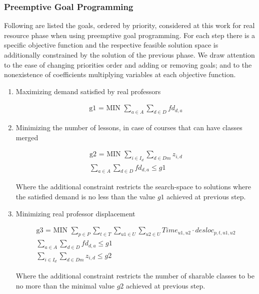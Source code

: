 \subsubsection{Preemptive Goal Programming}

Following are listed the goals, ordered by priority, considered at this work for real resource phase when using preemptive goal programming. For each step there is a specific objective function and the respective feasible solution space is additionally constrained by the solution of the previous phase. We draw attention to the ease of changing priorities order and adding or removing goals; and to the nonexistence of coefficients multiplying variables at each objective function.

\begin{enumerate}

\item{Maximizing demand satisfied by real professors}

\begin{align*}
   \mbox{g1 = MIN  } \sum\limits_{a \in A}\sum\limits_{d \in D} fd_{d,a}
\end{align*}

\item{Minimizing the number of lessons, in case of courses that can have classes merged}

\begin{align*}
  \mbox{g2 = MIN  } \sum\limits_{i \in I_{d}} \sum\limits_{d \in Dm} z_{i,d}
	\\
	\sum\limits_{a \in A}\sum\limits_{d \in D} fd_{d,a} \le g1
\end{align*}

Where the additional constraint restricts the search-space to solutions where the satisfied demand is no less than the value $g1$ achieved at previous step.

\item{Minimizing real professor displacement}

\begin{align*}
  \mbox{g3 = MIN  } \sum\limits_{p \in P} \sum\limits_{t \in T} \sum\limits_{u1 \in U} \sum\limits_{u2 \in U} Time_{u1,u2} \cdot desloc_{p,t,u1,u2}
	\\
	\sum\limits_{a \in A}\sum\limits_{d \in D} fd_{d,a} \le g1
	\\
	\sum\limits_{i \in I_{d}} \sum\limits_{d \in Dm} z_{i,d} \le g2
\end{align*}

Where the additional constraint restricts the number of sharable classes to be no more than the minimal value $g2$ achieved at previous step.


\end{enumerate}
